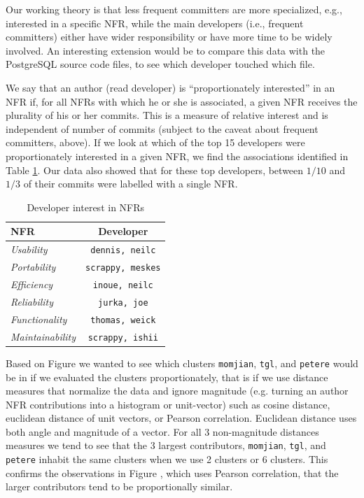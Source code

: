\documentclass[smallextended]{svjour3}       %
\begin{document}
Our working theory is that less frequent committers are more
specialized, e.g., interested in a specific NFR, while the main developers (i.e., frequent committers) either have wider responsibility or have more
time to be widely involved. An interesting extension would be to compare this data with 
the PostgreSQL source code files, to see which developer touched which file.

We say that an author (read developer) is ``proportionately interested'' in an NFR if, for all NFRs with which he or she is associated, a given NFR receives the plurality of his or her commits. This is a measure of relative interest and is independent of number of commits (subject to the caveat about frequent committers, above).
If we look at which of the top 15 developers were proportionately interested in a given NFR, we find the associations identified in Table \ref{tbl:devinterest}. Our data also showed that for these top developers, between $1/10$ and $1/3$ of their commits were labelled with a single NFR.

\begin{table}
\centering
\begin{tabular}{l|c}
\toprule
\textbf{NFR} & \textbf{Developer} \\
\midrule
\emph{Usability} & \texttt{dennis, neilc} \\
\emph{Portability} & \texttt{scrappy, meskes} \\
\emph{Efficiency} & \texttt{inoue, neilc} \\
\emph{Reliability} & \texttt{jurka, joe} \\
\emph{Functionality} & \texttt{thomas, weick} \\
\emph{Maintainability} & \texttt{scrappy, ishii}\\
\bottomrule
\end{tabular}
	\caption{Developer interest in NFRs}
	\label{tbl:devinterest}
\end{table}

Based on Figure \label{fig:authorsim} we wanted to see which clusters
\texttt{momjian}, \texttt{tgl}, and \texttt{petere} would be in if we
evaluated the clusters proportionately, that is if we use distance
measures that normalize the data and ignore magnitude (e.g. turning an
author NFR contributions into a histogram or unit-vector) such as
cosine distance, euclidean distance of unit vectors, or Pearson
correlation. Euclidean distance uses both angle and magnitude of a
vector. For all 3 non-magnitude distances measures we tend to see that
the 3 largest contributors, \texttt{momjian}, \texttt{tgl}, and
\texttt{petere} inhabit the same clusters when we use 2 clusters or 6
clusters. This confirms the observations in
Figure \label{fig:authorsim}, which uses Pearson correlation, that the larger contributors tend to be
proportionally similar.
\end{document}
